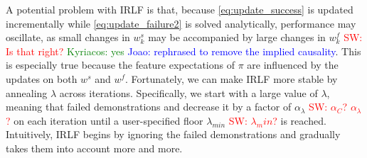 \documentclass[letterpaper]{article}
\DeclareMathOperator*{\argmax}{\arg\!\max}
\newcommand{\sw}[1]{\textcolor{red}{SW: #1}}
\newcommand{\jm}[1]{\textcolor{blue}{Joao: #1}}
\newcommand{\ks}[1]{\textcolor{green}{Kyriacos: #1}}
\newcommand{\sw}[1]{}
\newcommand{\jm}[1]{}
\newcommand{\ks}[1]{}
\begin{document}
A potential problem with IRLF is that, because \eqref{eq:update_success} is updated incrementally while \eqref{eq:update_failure2} is solved analytically, performance may oscillate, as small changes in $w^s_k$ may be accompanied by large changes in $w^f_k$ \sw{Is that right?} \ks{yes} \jm{rephrased to remove the implied causality}. This is especially true because the feature expectations of $\pi$ are influenced by the updates on both $w^s$ and $w^f$. Fortunately, we can make IRLF more stable by annealing $\lambda$ across iterations.  Specifically, we start with a large value of $\lambda$, meaning that failed demonstrations and decrease it by a factor of $\alpha_{\lambda}$ \sw{$\alpha_C$? $\alpha_\lambda$?} on each iteration until a user-specified floor $\lambda_{min}$ \sw{$\lambda_min$?} is reached.  Intuitively, IRLF begins by ignoring the failed demonstrations and gradually takes them into account more and more.

	




\end{document}
